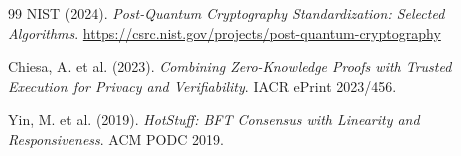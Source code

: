 \begin{thebibliography}{99}
NIST (2024). \textit{Post-Quantum Cryptography Standardization: Selected Algorithms}. \url{https://csrc.nist.gov/projects/post-quantum-cryptography}

Chiesa, A. et al. (2023). \textit{Combining Zero-Knowledge Proofs with Trusted Execution for Privacy and Verifiability}. IACR ePrint 2023/456.


Yin, M. et al. (2019). \textit{HotStuff: BFT Consensus with Linearity and Responsiveness}. ACM PODC 2019.

\end{thebibliography}

\appendix

